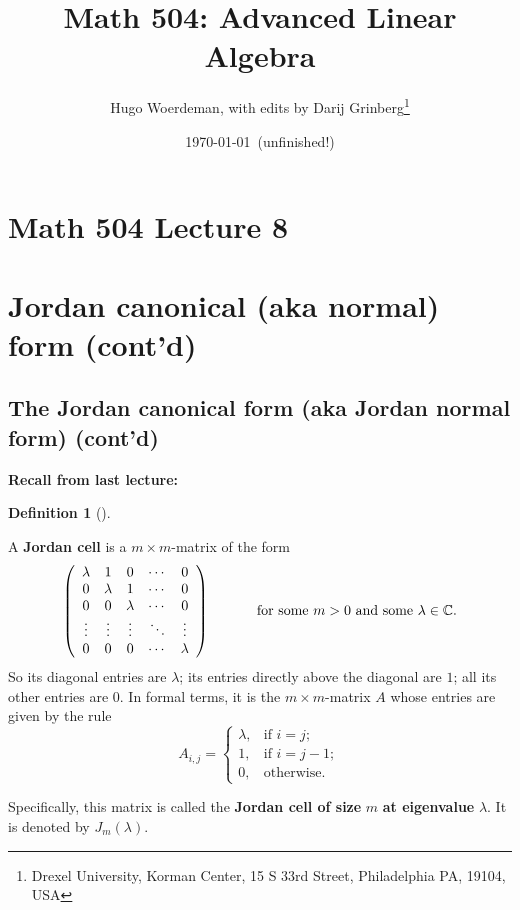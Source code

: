 \documentclass[numbers=enddot,12pt,final,onecolumn,notitlepage]{scrartcl}%
\numberwithin{exer}{subsection}
\theoremstyle{definition}
\newtheorem{defi}[theo]{Definition}
\newenvironment{definition}[1][]
{\begin{defi}[#1]\begin{leftbar}}
{\end{leftbar}\end{defi}}
\begin{document}
\title{Math 504: Advanced Linear Algebra}
\author{Hugo Woerdeman, with edits by Darij Grinberg\thanks{Drexel University, Korman
Center, 15 S 33rd Street, Philadelphia PA, 19104, USA}}
\date{\today\ (unfinished!)}
\maketitle
\tableofcontents

\section*{Math 504 Lecture 8}

\section{Jordan canonical (aka normal) form (cont'd)}

\subsection{The Jordan canonical form (aka Jordan normal form) (cont'd)}

\textbf{Recall from last lecture:}

\begin{definition}
A \textbf{Jordan cell} is a $m\times m$-matrix of the form%
\[
\left(
\begin{array}
[c]{ccccc}%
\lambda & 1 & 0 & \cdots & 0\\
0 & \lambda & 1 & \cdots & 0\\
0 & 0 & \lambda & \cdots & 0\\
\vdots & \vdots & \vdots & \ddots & \vdots\\
0 & 0 & 0 & \cdots & \lambda
\end{array}
\right)  \ \ \ \ \ \ \ \ \ \ \text{for some }m>0\text{ and some }\lambda
\in\mathbb{C}.
\]
So its diagonal entries are $\lambda$; its entries directly above the diagonal
are $1$; all its other entries are $0$. In formal terms, it is the $m\times
m$-matrix $A$ whose entries are given by the rule%
\[
A_{i,j}=%
\begin{cases}
\lambda, & \text{if }i=j;\\
1, & \text{if }i=j-1;\\
0, & \text{otherwise.}%
\end{cases}
\]


Specifically, this matrix is called the \textbf{Jordan cell of size }$m$
\textbf{at eigenvalue }$\lambda$. It is denoted by $J_{m}\left(
\lambda\right)  $.
\end{definition}
\end{document}
